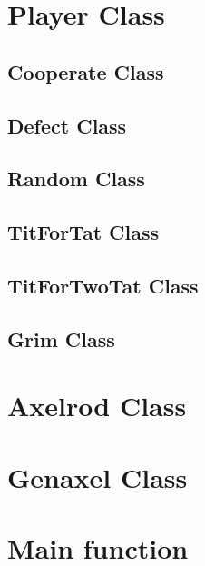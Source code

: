 \section{Player Class}

\subsection{Cooperate Class}

\subsection{Defect Class}

\subsection{Random Class}

\subsection{TitForTat Class}

\subsection{TitForTwoTat Class}

\subsection{Grim Class}


\section{Axelrod Class}

\section{Genaxel Class}

\section{Main function}